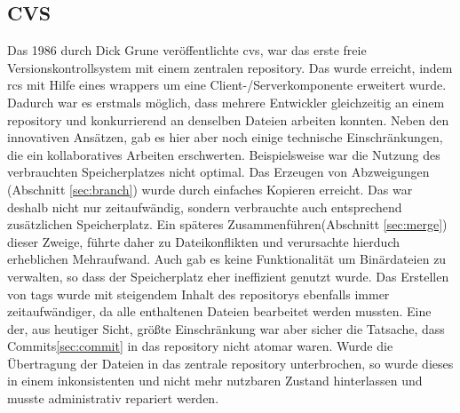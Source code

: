 \subsection{CVS}\label{sec:cvs}
Das 1986 durch Dick Grune veröffentlichte \acrfull{cvs}, war das erste freie
Versionskontrollsystem mit einem zentralen \gls{repository}. Das wurde
erreicht, indem \acrshort{rcs} mit Hilfe eines \glspl{wrapper} um eine
Client-/Serverkomponente erweitert wurde. Dadurch war es erstmals möglich, dass
mehrere Entwickler gleichzeitig an einem \gls{repository} und konkurrierend an
denselben Dateien arbeiten konnten. Neben den innovativen Ansätzen, gab es hier
aber noch einige technische Einschränkungen, die ein kollaboratives Arbeiten
erschwerten. Beispielsweise war die Nutzung des verbrauchten Speicherplatzes
nicht optimal. Das Erzeugen von Abzweigungen (Abschnitt \ref{sec:branch}) wurde
durch einfaches Kopieren erreicht. Das war deshalb nicht nur zeitaufwändig,
sondern verbrauchte auch entsprechend zusätzlichen Speicherplatz. Ein späteres
Zusammenführen(Abschnitt \ref{sec:merge}) dieser Zweige, führte daher zu
Dateikonflikten und verursachte hierduch erheblichen Mehraufwand. Auch gab es
keine Funktionalität um Binärdateien zu verwalten, so dass der Speicherplatz eher
ineffizient genutzt wurde. Das Erstellen von \glspl{tag} wurde mit
steigendem Inhalt des \glspl{repository} ebenfalls immer zeitaufwändiger, da
alle enthaltenen Dateien bearbeitet werden mussten. Eine der, aus heutiger
Sicht, größte Einschränkung war aber sicher die Tatsache, dass
Commits\ref{sec:commit} in das \gls{repository} nicht atomar waren. Wurde die
Übertragung der Dateien in das zentrale \gls{repository} unterbrochen, so wurde
dieses in einem inkonsistenten und nicht mehr nutzbaren Zustand hinterlassen
und musste administrativ repariert werden.\cite[S.~382-383]{cd}


